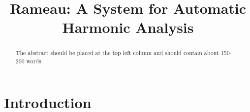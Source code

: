\documentclass{article}
\title{Rameau: A System for Automatic Harmonic Analysis}
\begin{document}
\maketitle

\begin{abstract}
The abstract should be placed at the top left column and should contain
about 150-200 words.
\end{abstract}

\section{Introduction}
\label{sec:introduction}


\end{document}
